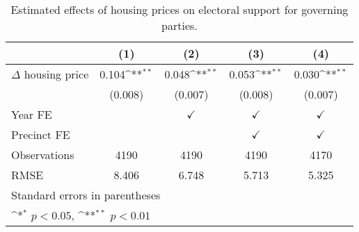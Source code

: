 \begin{table}[htbp]\centering
\def\sym#1{\ifmmode^{#1}\else\(^{#1}\)\fi}
\caption{Estimated effects of housing prices on electoral support for governing parties.} \label{predv}
\begin{tabular}{l*{4}{c}}
\hline\hline
                    &\multicolumn{1}{c}{(1)}        &\multicolumn{1}{c}{(2)}        &\multicolumn{1}{c}{(3)}        &\multicolumn{1}{c}{(4)}        \\
\hline
$\Delta$ housing price&       0.104\sym{**}&       0.048\sym{**}&       0.053\sym{**}&       0.030\sym{**}\\
                    &     (0.008)        &     (0.007)        &     (0.008)        &     (0.007)        \\
[1em]
\hline Year FE      &                    &$\checkmark$        &$\checkmark$        &$\checkmark$        \\
[1em]
Precinct FE         &                    &                    &$\checkmark$        &$\checkmark$        \\
\hline
Observations        &        4190        &        4190        &        4190        &        4170        \\
RMSE                &       8.406        &       6.748        &       5.713        &       5.325        \\
\hline\hline
\multicolumn{5}{l}{\footnotesize Standard errors in parentheses}\\
\multicolumn{5}{l}{\footnotesize \sym{*} \(p<0.05\), \sym{**} \(p<0.01\)}\\
\end{tabular}
\end{table}
